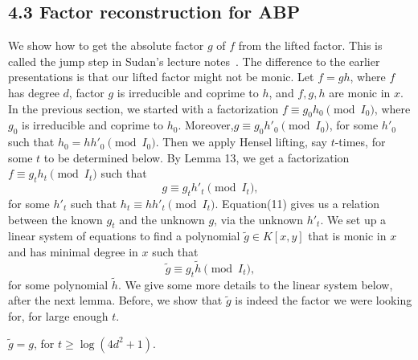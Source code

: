 \subsection*{4.3 Factor reconstruction for ABP}
We show how to get the absolute factor $g$ of $f$ from the lifted factor. This is called the jump step in Sudan's lecture notes~\cite{ref18}. The difference to the earlier presentations is that our lifted factor might not be monic.
Let $f=gh$, where $f$ has degree $d$, factor $g$ is irreducible and coprime to $h$, and $f,g,h$ are monic in $x$. In the previous section, we started with a factorization $f\equiv g_0h_0\pmod{I_0}$, where $g_0$ is irreducible and coprime to $h_0$. Moreover,$g\equiv g_0h'_0\pmod{I_0}$, for some $h'_0$ such that $h_0=hh'_0\pmod{I_0}$.
Then we apply Hensel lifting, say $t$-times, for some $t$ to be determined below. By Lemma 13, we get a factorization $f\equiv g_th_t\pmod{I_t}$ such that
\begin{equation}g\equiv g_th'_t\pmod{I_t},\tag{11}\end{equation}
for some $h'_t$ such that $h_t\equiv hh'_t\pmod{I_t}$.
Equation(11) gives us a relation between the known $g_t$ and the unknown $g$, via the unknown $h'_t$. We set up a linear system of equations to find a polynomial $\widetilde g\in K[x,y]$ that is monic in $x$ and has minimal degree in $x$ such that
\begin{equation}\widetilde g\equiv g_t\widetilde h\pmod{I_t},\tag{12}\end{equation}
for some polynomial $\widetilde h$. We give some more details to the linear system below, after the next lemma. Before, we show that $\widetilde g$ is indeed the factor we were looking for, for large enough $t$.
\begin{ntlemma}
$\widetilde g=g$, for $t\geq\log(4d^2+1)$.
\end{ntlemma}
